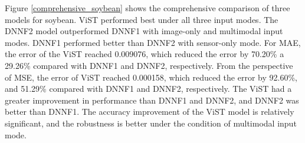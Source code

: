 \documentclass[acmsmall,manuscript, screen, review]{acmart}
\begin{document}
Figure \ref{comprehensive_soybean} shows the comprehensive comparison of three models for soybean. ViST performed best under all three input modes. The DNNF2 model outperformed DNNF1 with image-only and multimodal input modes. DNNF1 performed better than DNNF2 with sensor-only mode. For MAE, the error of the ViST reached 0.009076, which reduced the error by 70.20\% a   29.26\% compared with DNNF1 and DNNF2, respectively. From the perspective of MSE, the error of ViST reached 0.000158, which reduced the error by 92.60\%, and 51.29\% compared with DNNF1 and DNNF2, respectively. The ViST had a greater improvement in performance than DNNF1 and DNNF2, and DNNF2 was better than DNNF1. The accuracy improvement of the ViST model is relatively significant, and the robustness is better under the condition of multimodal input mode.
\end{document}
